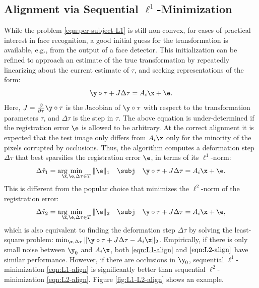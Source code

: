 \subsection{Alignment via Sequential $\ell^1$-Minimization} While the problem
\eqref{eqn:per-subject-L1} is still non-convex, for cases of practical interest
in face recognition, a good initial guess for the transformation is available,
e.g., from the output of a face detector. This initialization can be refined to
approach an estimate of the true transformation by repeatedly linearizing about  the
current estimate of $\tau$, and seeking representations of the form:
\begin{equation}
\y\circ \tau + J \Delta \tau = A_i \x + \e.
\end{equation}
Here, $J = \frac{\partial}{\partial \tau} \y \circ \tau$ is the Jacobian of $\y
\circ \tau$ with respect to the transformation parameters $\tau$, and $\Delta
\tau$ is the step in $\tau$. The above equation is under-determined if the
registration error $\e$ is allowed to be arbitrary. At the correct alignment it
is expected that the test image only differs from $A_i \x$ only for the
minority of the pixels corrupted by occlusions. Thus, the algorithm computes a
deformation step $\Delta \tau$ that best sparsifies the registration error
$\e$, in terms of its $\ell^1$-norm:
\begin{equation}
\Delta\hat{\tau}_1 = \arg\hspace{-3.5mm}\min_{\x,\e,\Delta\tau \in T} \| \e \|_1 \quad \subj \quad \y\circ\tau + J \Delta \tau = A_i \x + \e.
\label{eqn:L1-align}
\end{equation}
This is different from the popular choice that
minimizes the $\ell^2$-norm of the registration error:
\begin{equation}
\Delta\hat{\tau}_2 = \arg\hspace{-3.5mm}\min_{\x,\e,\Delta\tau \in T} \| \e \|_2 \quad \subj \quad \y\circ\tau + J \Delta \tau = A_i \x + \e,
\label{eqn:L2-align}
\end{equation}
which is also equivalent to finding the deformation step
$\Delta  \tau$ by solving the least-square problem:
$\min_{\x,\Delta \tau} \|\y \circ \tau + J\Delta \tau - A_i \x
\|_2$. Empirically, if there is only small noise
between $\y_0$ and $A_i\x$, both \eqref{eqn:L1-align} and
$\eqref{eqn:L2-align}$ have similar performance.  However, if
there are occlusions in $\y_0$, sequential
$\ell^1$-minimization \eqref{eqn:L1-align} is significantly
better than sequential $\ell^2$-minimization
\eqref{eqn:L2-align}. Figure \ref{fig:L1-L2-align} shows an
example.


